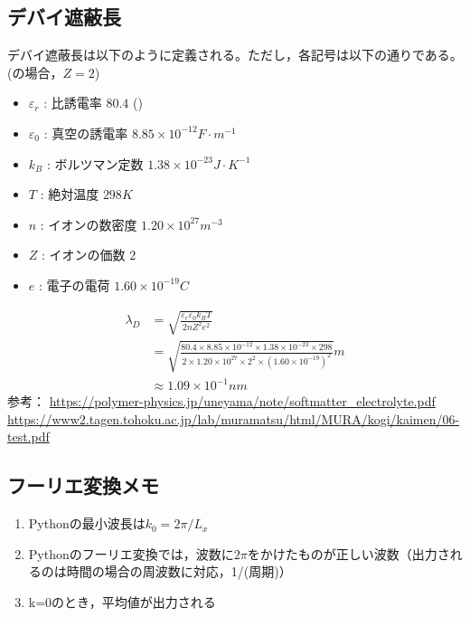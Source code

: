 \documentclass{ltjsarticle}
\begin{document}
\subsection{デバイ遮蔽長}
デバイ遮蔽長は以下のように定義される。ただし，各記号は以下の通りである。(の場合，$Z=2$)
\begin{itemize}
  \item $\varepsilon_r$ : 比誘電率 $80.4$ ()
  \item $\varepsilon_0$ : 真空の誘電率 $8.85\times 10^{-12} \si{F\cdot m^{-1}}$
  \item $k_B$ : ボルツマン定数 $1.38\times 10^{-23} \si{J\cdot K^{-1}}$
  \item $T$ : 絶対温度 $298 \si{K}$
  \item $n$ : イオンの数密度 $1.20\times 10^{27} \si{m^{-3}}$
  \item $Z$ : イオンの価数 $2$
  \item $e$ : 電子の電荷 $1.60\times 10^{-19} \si{C}$
\end{itemize}
\begin{equation}
  \begin{split}
    \lambda_D & =\sqrt{\frac{\varepsilon_r \varepsilon_0 k_BT}{2nZ^2e^2}}                                                                                                    \\
              & =\sqrt{\frac{80.4\times 8.85\times 10^{-12}\times 1.38\times 10^{-23}\times 298}{2\times 1.20\times 10^{27}\times 2^2\times (1.60\times 10^{-19})^2}} \si{m} \\
              & \approx 1.09 \times 10^{-1} \si{nm}
  \end{split}
\end{equation}
参考：
\url{https://polymer-physics.jp/uneyama/note/softmatter_electrolyte.pdf}\\
\url{https://www2.tagen.tohoku.ac.jp/lab/muramatsu/html/MURA/kogi/kaimen/06-test.pdf}\\

\subsection{フーリエ変換メモ}
\begin{enumerate}
  \item Pythonの最小波長は$k_0=2\pi/L_x$
  \item Pythonのフーリエ変換では，波数に$2\pi$をかけたものが正しい波数（出力されるのは時間の場合の周波数に対応，1/(周期)）
  \item k=0のとき，平均値が出力される
\end{enumerate}
\end{document}
